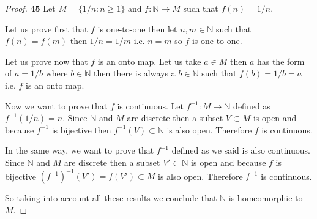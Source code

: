 \documentclass[11pt]{article}
\newcommand{\N}{\mathbb{N}}
\theoremstyle{definition}
\begin{document}
    \begin{proof}{\textbf{45}}
        Let $M = \{1/n : n\ge 1\}$ and $f:\N \to M$ such that $f(n) = 1/n$.

        Let us prove first that $f$ is one-to-one then let $n,m \in \N$ such
        that $f(n)=f(m)$ then $1/n = 1/m$ i.e. $n = m$ so $f$ is one-to-one.

        Let us prove now that $f$ is an onto map. Let us take $a \in M$ then
        $a$ has the form of $a = 1/b$ where $b \in \N$ then there is always a
        $b \in \N$ such that $f(b) = 1/b = a$ i.e. $f$ is an onto map.

        Now we want to prove that $f$ is continuous. Let $f^{-1}:M \to \N$
        defined as $f^{-1}(1/n) = n$. Since $\N$ and $M$ are discrete then a
        subset $V \subset M$ is open and because $f^{-1}$ is bijective then
        $f^{-1}(V) \subset \N$ is also open. Therefore $f$ is continuous.

        In the same way, we want to prove that $f^{-1}$ defined as we said is
        also continuous. Since $\N$ and $M$ are discrete then a
        subset $V' \subset \N$ is open and because $f$ is bijective
        $(f^{-1})^{-1}(V') = f(V') \subset M$ is also open. Therefore
        $f^{-1}$ is continuous.
        
        So taking into account all these results we conclude that $\N$ is
        homeomorphic to $M$. 
    \end{proof}
\cleardoublepage
\end{document}
